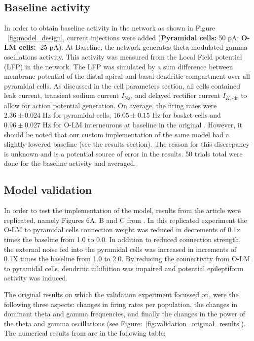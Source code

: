 \subsection{Baseline activity}
In order to obtain baseline activity in the network as shown in Figure
~\ref{fig:model_design}, current injections were added (\textbf{Pyramidal
    cells:} 50 pA\@; \textbf{O-LM cells:} -25 pA). At Baseline, the network
generates theta-modulated gamma oscillations activity. This activity was
measured from the Local Field potential (LFP) in the network. The LFP was
simulated by a sum difference between membrane potential of the distal apical
and basal dendritic compartment over all pyramidal cells. As discussed in the
cell parameters section, all cells contained leak current, transient sodium
current \(I_{\text{Na}}\), and delayed rectifier current \(I_{K, \text{-}
        \text{dr}}\) to allow for action potential generation. On average, the firing
rates were \(2.36 \pm 0.024\) Hz for pyramidal cells, \(16.05 \pm 0.15\) Hz for
basket cells and \(0.96 \pm 0.027\) Hz for O-LM interneurons at baseline in the
original \parencite{sanjayImpairedDendriticInhibition2015}. However, it should
be noted that our custom implementation of the same model had a slightly
lowered baseline (see the results section). The reason for this discrepancy is
unknown and is a potential source of error in the results. 50 trials total were
done for the baseline activity and averaged.

\subsection{Model validation}
In order to test the implementation of the model, results from the article were
replicated, namely Figures 6A, B and C from
\textcite{sanjayImpairedDendriticInhibition2015}. In this replicated experiment
the O-LM to pyramidal cells connection weight was reduced in decrements of 0.1x
times the baseline from 1.0 to 0.0. In addition to reduced connection strength,
the external noise fed into the pyramidal cells was increased in increments of
0.1X times the baseline from 1.0 to 2.0. By reducing the connectivity from O-LM
to pyramidal cells, dendritic inhibition was impaired and potential
epileptiform activity was induced.

The original results on which the validation experiment focussed on, were the
following three aspects: changes in firing rates per population, the changes in
dominant theta and gamma frequencies, and finally the changes in the power of
the theta and gamma oscillations (see
Figure:~\ref{fig:validation_original_results}). The numerical results from are
in the following table:

